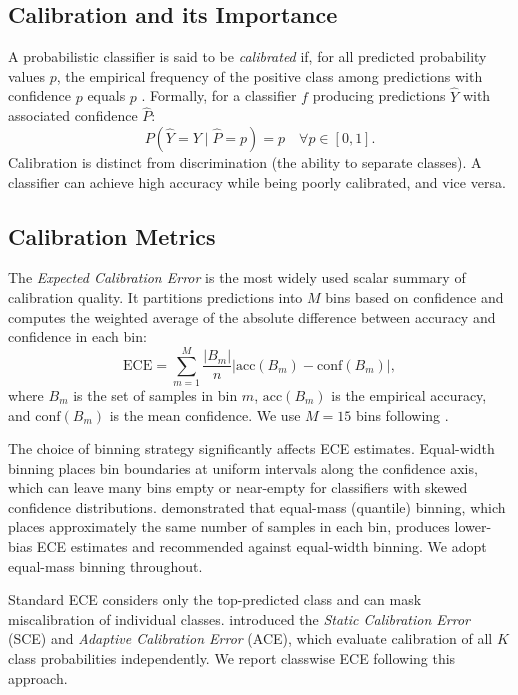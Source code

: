\documentclass[twocolumn]{aastex631}
\begin{document}
\subsection{Calibration and its Importance}

A probabilistic classifier is said to be \emph{calibrated} if, for all predicted probability values $p$, the empirical frequency of the positive class among predictions with confidence $p$ equals $p$ \citep{dawid1982}. Formally, for a classifier $f$ producing predictions $\hat{Y}$ with associated confidence $\hat{P}$:
\begin{equation}
P(\hat{Y} = Y \mid \hat{P} = p) = p \quad \forall p \in [0,1].
\end{equation}
Calibration is distinct from discrimination (the ability to separate classes). A classifier can achieve high accuracy while being poorly calibrated, and vice versa.

\subsection{Calibration Metrics}

The \emph{Expected Calibration Error} \citep[ECE;][]{naeini2015} is the most widely used scalar summary of calibration quality. It partitions predictions into $M$ bins based on confidence and computes the weighted average of the absolute difference between accuracy and confidence in each bin:
\begin{equation}
\text{ECE} = \sum_{m=1}^{M} \frac{|B_m|}{n} \left| \text{acc}(B_m) - \text{conf}(B_m) \right|,
\end{equation}
where $B_m$ is the set of samples in bin $m$, $\text{acc}(B_m)$ is the empirical accuracy, and $\text{conf}(B_m)$ is the mean confidence. We use $M = 15$ bins following \citet{guo2017}.

The choice of binning strategy significantly affects ECE estimates. Equal-width binning places bin boundaries at uniform intervals along the confidence axis, which can leave many bins empty or near-empty for classifiers with skewed confidence distributions. \citet{roelofs2022} demonstrated that equal-mass (quantile) binning, which places approximately the same number of samples in each bin, produces lower-bias ECE estimates and recommended against equal-width binning. We adopt equal-mass binning throughout.

Standard ECE considers only the top-predicted class and can mask miscalibration of individual classes. \citet{nixon2019} introduced the \emph{Static Calibration Error} (SCE) and \emph{Adaptive Calibration Error} (ACE), which evaluate calibration of all $K$ class probabilities independently. We report classwise ECE following this approach.
\end{document}
